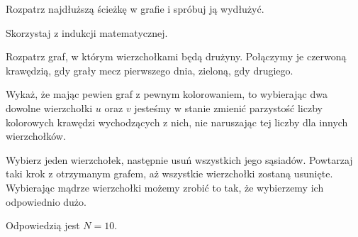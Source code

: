 
\begin{hints_list}
	\item Rozpatrz najdłuższą ścieżkę w grafie i spróbuj ją wydłużyć.
	\item Skorzystaj z indukcji matematycznej.
	\item Rozpatrz graf, w którym wierzchołkami będą drużyny. Połączymy je czerwoną krawędzią, gdy grały mecz pierwszego dnia, zieloną, gdy drugiego.
	\item Wykaż, że mając pewien graf z pewnym kolorowaniem, to wybierając dwa dowolne wierzchołki $u$ oraz $v$ jesteśmy w stanie zmienić parzystość liczby kolorowych krawędzi wychodzących z nich, nie naruszając tej liczby dla innych wierzchołków.
	\item Wybierz jeden wierzchołek, następnie usuń wszystkich jego sąsiadów. Powtarzaj taki krok z otrzymanym grafem, aż wszystkie wierzchołki zostaną usunięte. Wybierając mądrze wierzchołki możemy zrobić to tak, że wybierzemy ich odpowiednio dużo.
	\item Odpowiedzią jest $N = 10$.
\end{hints_list}